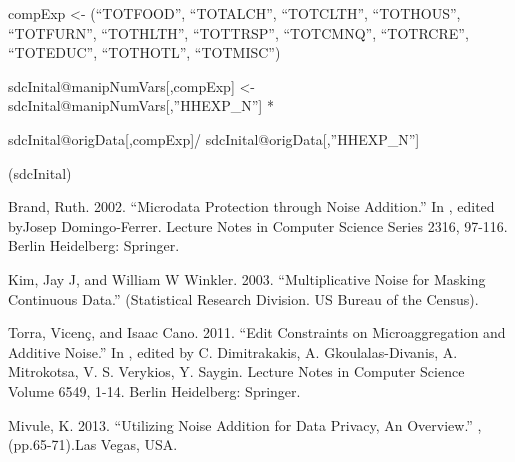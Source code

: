 \documentclass[letterpaper,10pt,english]{sphinxmanual}
\begin{document}
\begin{DUlineblock}{0em}
\item[] 
\item[] compExp \textless{}- (“TOTFOOD”, “TOTALCH”, “TOTCLTH”, “TOTHOUS”,
“TOTFURN”, “TOTHLTH”, “TOTTRSP”, “TOTCMNQ”, “TOTRCRE”, “TOTEDUC”,
“TOTHOTL”, “TOTMISC”)
\end{DUlineblock}

sdcInital@manipNumVars{[},compExp{]} \textless{}- sdcInital@manipNumVars{[},”HHEXP\_N”{]}
*

sdcInital@origData{[},compExp{]}/ sdcInital@origData{[},”HHEXP\_N”{]}

\begin{DUlineblock}{0em}
\item[] 
\item[] (sdcInital)
\end{DUlineblock}


Brand, Ruth. 2002. “Microdata Protection through Noise Addition.” In
,
edited byJosep Domingo-Ferrer. Lecture Notes in Computer Science Series
2316, 97-116. Berlin Heidelberg: Springer.

Kim, Jay J, and William W Winkler. 2003. “Multiplicative Noise for
Masking Continuous Data.”  (Statistical Research
Division. US Bureau of the Census).

Torra, Vicenç, and Isaac Cano. 2011. “Edit Constraints on
Microaggregation and Additive Noise.” In , edited by C. Dimitrakakis, A.
Gkoulalas-Divanis, A. Mitrokotsa, V. S. Verykios, Y. Saygin. Lecture
Notes in Computer Science Volume 6549, 1-14. Berlin Heidelberg:
Springer. 

Mivule, K. 2013. “Utilizing Noise Addition for Data Privacy, An
Overview.” , (pp.65-71).Las Vegas, USA.
\end{document}
